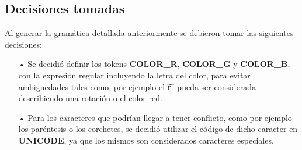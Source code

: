 \subsection{Decisiones tomadas}

Al generar la gram\'atica detallada anteriormente se debieron tomar las siguientes decisiones:

\begin{itemize}
\item[•] Se decidi\'o definir los tokens \textbf{COLOR\_R}, \textbf{COLOR\_G} y  \textbf{COLOR\_B}, con la expresión regular incluyendo la letra del color, para evitar ambiguedades tales como, por ejemplo el \textbf{\" r \" } pueda ser considerada describiendo una rotación o el color red.

\item[•] Para los caracteres que podr\'ian llegar a tener conflicto, como por ejemplo los par\'entesis o los corchetes, se decidi\'o utilizar el c\'odigo de dicho caracter en \textbf{UNICODE}, ya que los mismos son considerados caracteres especiales.

\end{itemize}

